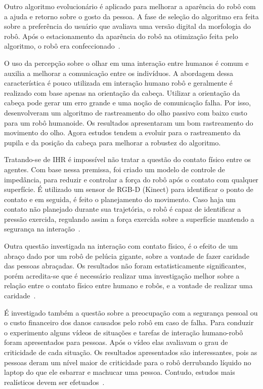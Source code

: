 Outro algoritmo evolucionário é aplicado para melhorar a aparência do robô com a ajuda e retorno sobre o gosto da pessoa. A fase de seleção do algoritmo era feita sobre a preferência do usuário que avaliava uma versão digital da morfologia do robô. Após o estacionamento da aparência do robô na otimização feita pelo algoritmo, o robô era confeccionado~\cite{debeir:2016}.

O uso da percepção sobre o olhar em uma interação entre humanos é comum e auxilia a melhorar a comunicação entre os indivíduos. A abordagem dessa característica é pouco utilizada em interação humano robô e geralmente é realizado com base apenas na orientação da cabeça. Utilizar a orientação da cabeça pode gerar um erro grande e uma noção de comunicação falha. Por isso, \textcite{palinko:2016} desenvolveram um algoritmo de rastreamento do olho passivo com baixo custo para um robô humanoide. Os resultados apresentaram um bom rastreamento do movimento do olho. Agora estudos tendem a evoluir para o rastreamento da pupila e da posição da cabeça para melhorar a robustez do algoritmo.

Tratando-se de IHR é impossível não tratar a questão do contato físico entre os agentes. Com base nessa premissa, foi criado um modelo de controle de impedância, para reduzir e controlar a força do robô após o contato com qualquer superfície. É utilizado um sensor de RGB-D (Kinect) para identificar o ponto de contato e em seguida, é feito o planejamento do movimento. Caso haja um contato não planejado durante sua trajetória, o robô é capaz de identificar a pressão exercida, regulando assim a força exercida sobre a superfície mantendo a segurança na interação~\cite{magrini:2015}.

Outra questão investigada na interação com contato físico, é o efeito de um abraço dado por um robô de pelúcia gigante, sobre a vontade de fazer caridade das pessoas abraçadas. Os resultados não foram estatisticamente significantes, porém acredita-se que é necessário realizar uma investigação melhor sobre a relação entre o contato físico entre humano e robôs, e a vontade de realizar uma caridade~\cite{nakata:2017}.

É investigado também a questão sobre a preocupação com a segurança pessoal ou o custo financeiro dos danos causados pelo robô em caso de falha. Para conduzir o experimento alguns vídeos de situações e tarefas de interação humano-robô foram apresentados para pessoas. Após o vídeo elas avaliavam o grau de criticidade de cada situação.
Os resultados apresentados são interessantes, pois as pessoas deram um nível maior de criticidade para o robô derrubando líquido no laptop do que ele esbarrar e machucar uma pessoa. Contudo, estudos mais realísticos devem ser efetuados~\cite{adubor:2017}.

